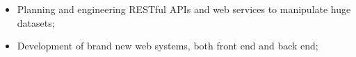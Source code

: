 
\begin{itemize}
  \item Planning and engineering RESTful APIs and web services to manipulate huge datasets;
  \item Development of brand new web systems, both front end and back end;
\end{itemize}
